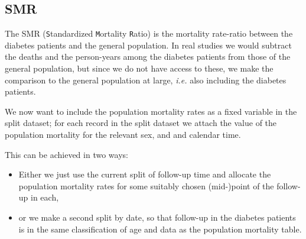 \subsection*{SMR}




The SMR (\texttt{S}tandardized \texttt{M}ortality \texttt{R}atio) is
the mortality rate-ratio between the diabetes patients and the general
population.  In real studies we would subtract the deaths and the
person-years among the diabetes patients from those of the general
population, but since we do not have access to these, we make the
comparison to the general population at large, \textit{i.e.} also
including the diabetes patients.

We now want to include the population mortality rates as a fixed
variable in the split dataset; for each record in the split dataset we
attach the value of the population mortality for the relevant sex, and
and calendar time.

This can be achieved in two ways:
\begin{itemize}
\item Either we just use the current split of follow-up time and
  allocate the population mortality rates for some suitably chosen
  (mid-)point of the follow-up in each,
\item or we make a second split by date, so that follow-up in the
  diabetes patients is in the same classification of age and data as
  the population mortality table.
\end{itemize}

